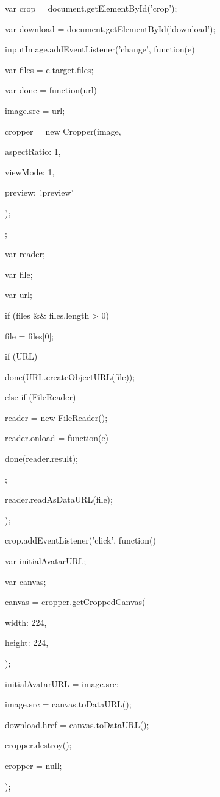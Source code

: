 \documentclass[bachelor_p]{hdu-thesis}
\begin{document}
var crop = document.getElementById('crop');

var download = document.getElementById('download');

inputImage.addEventListener('change', function(e) {

var files = e.target.files;

var done = function(url) {

image.src = url;

cropper = new Cropper(image, {

aspectRatio: 1,

viewMode: 1,

preview: '.preview'

});

};

var reader;

var file;

var url;

if (files $\&$$\&$ files.length > 0) {
				
file = files[0];
				
if (URL) {
					
done(URL.createObjectURL(file));
				
} else if (FileReader) {
					
reader = new FileReader();
					
reader.onload = function(e) {
						
done(reader.result);
					
};
					
reader.readAsDataURL(file);
				
}
			
}
		
});

crop.addEventListener('click', function() {
			
var initialAvatarURL;
			
var canvas;
			
canvas = cropper.getCroppedCanvas({
				
width: 224,
				
height: 224,
			
});
			
initialAvatarURL = image.src;
			
image.src = canvas.toDataURL();
			
download.href = canvas.toDataURL();
			
cropper.destroy();
			
cropper = null;
		
});
	
\end{document}
